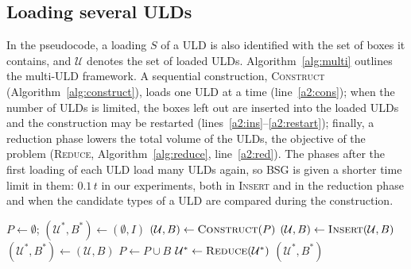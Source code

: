\subsection{Loading several ULDs}
\label{sec:alg-multi}

In the pseudocode, a loading $S$ of a ULD is also identified with the set of boxes it contains, and
$\mathcal{U}$ denotes the set of loaded ULDs. Algorithm~\ref{alg:multi} outlines the multi-ULD framework. A sequential construction,
\textsc{Construct} (Algorithm~\ref{alg:construct}), loads one ULD at a time
(line~\ref{a2:cons}); when the number of ULDs is limited, the boxes left out are inserted into
the loaded ULDs and the construction may be restarted (lines~\ref{a2:ins}--\ref{a2:restart}); finally, a reduction phase lowers the total volume of the
ULDs, the objective of the problem (\textsc{Reduce}, Algorithm~\ref{alg:reduce}, line~\ref{a2:red}). The phases after the
first loading of each ULD load many ULDs again, so BSG is given a shorter time limit in them:
$0.1\,t$ in our experiments, both in \textsc{Insert} and in the reduction phase and when the
candidate types of a ULD are compared during the construction.

\begin{algorithm}[t]
\caption{Multi-ULD framework.}
\label{alg:multi}
\begin{algorithmic}[1]
\State $P \gets \emptyset$; $(\mathcal{U}^*, B^*) \gets (\emptyset, I)$ 
\Repeat
	\State $(\mathcal{U}, B) \gets \textsc{Construct}(P)$  \label{a2:cons}
		\State $(\mathcal{U}, B) \gets \textsc{Insert}(\mathcal{U}, B)$  \label{a2:ins}
	\EndIf
	 $(\mathcal{U}^*, B^*) \gets (\mathcal{U}, B)$ \EndIf \label{a2:keep}
	\State $P \gets P \cup B$ \label{a2:prio}
 \label{a2:restart}
\State $\mathcal{U}^* \gets \textsc{Reduce}(\mathcal{U}^*)$  \label{a2:red}
\State \Return $(\mathcal{U}^*, B^*)$
\end{algorithmic}
\end{algorithm}

